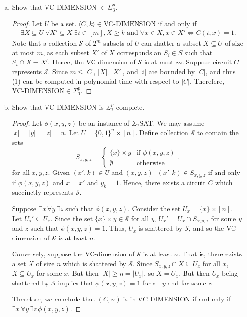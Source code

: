 \documentclass[a4paper]{article}
\begin{document}
\begin{enumerate}[(a)]
  \item Show that VC-DIMENSION $\in \Sigma_3^p$.
  \begin{proof}
    Let $U$ be a set. $\langle C, k \rangle \in \text{VC-DIMENSION}$ if and only if
    \begin{gather}
      \exists X \subseteq U \; \forall X' \subseteq X \; \exists i \in [m], X \geq k \text{ and } \forall x \in X, x \in X' \Leftrightarrow C(i, x) = 1.
    \end{gather}
    Note that a collection $\mathcal{S}$ of $2^m$ subsets of $U$ can shatter a subset $X \subseteq U$ of size at most $m$, as each subset $X'$ of $X$ corresponds an $S_i \in S$ such that $S_i \cap X = X'$. Hence, the VC dimension of $\mathcal{S}$ is at most $m$. Suppose circuit $C$ represents $\mathcal{S}$. Since $m \leq |C|$, $|X|$, $|X'|$, and $|i|$ are bounded by $|C|$, and thus (1) can be computed in polynomial time with respect to $|C|$. Therefore, $\text{VC-DIMENSION} \in \Sigma_3^p$.
  \end{proof}
  \item Show that VC-DIMENSION is $\Sigma_3^p$-complete.
  \begin{proof}
    Let $\phi(x, y, z)$ be an instance of $\Sigma_3$SAT. We may assume $|x| = |y| = |z| = n$. Let $U = \{0, 1\}^n \times [n]$. Define collection $\mathcal{S}$ to contain the sets
    \[
      S_{x, y, z} = \begin{cases}
        \{x\} \times y & \text{if } \phi(x, y, z) \\
        \emptyset & \text{otherwise}
      \end{cases},
    \]
    for all $x, y, z$. Given $(x', k) \in U$ and $(x, y, z)$, $(x', k) \in S_{x, y, z}$ if and only if $\phi(x, y, z)$ and $x = x'$ and $y_k = 1$. Hence, there exists a circuit $C$ which succinctly represents $\mathcal{S}$. 

    Suppose $\exists x \, \forall y \, \exists z$ such that $\phi(x, y, z)$. Consider the set $U_x = \{x\} \times [n]$. Let $U_x' \subseteq U_x$. Since the set $\{x\} \times y \in \mathcal{S}$ for all $y$, $U_x' = U_x \cap S_{x, y, z}$ for some $y$ and $z$ such that $\phi(x, y, z) = 1$. Thus, $U_x$ is shattered by $\mathcal{S}$, and so the VC-dimension of $\mathcal{S}$ is at least $n$.

    Conversely, suppose the VC-dimension of $\mathcal{S}$ is at least $n$. That is, there exists a set $X$ of size $n$ which is shattered by $\mathcal{S}$. Since $S_{x, y, z} \cap X \subseteq U_x$ for all $x$, $X \subseteq U_x$ for some $x$. But then $|X| \geq n = |U_x|$, so $X = U_x$. But then $U_x$ being shattered by $\mathcal{S}$ implies that $\phi(x, y, z) = 1$ for all $y$ and for some $z$. 

    Therefore, we conclude that $(C, n)$ is in VC-DIMENSION if and only if $\exists x \, \forall y \, \exists z \, \phi(x, y, z)$. 
  \end{proof}
\end{enumerate}
\end{document}
